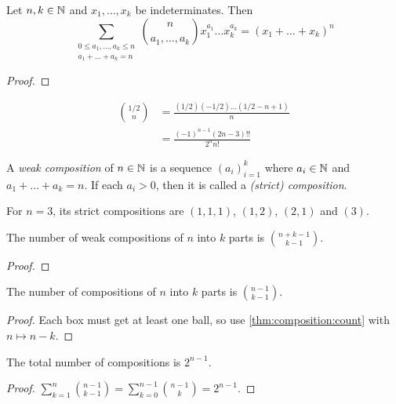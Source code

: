 
\begin{theorem} \label{thm:multinomial}
    Let $n, k \in \mathbb{N}$ and $x_1, \dots, x_k$ be indeterminates.
    Then \[
        \sum_{\substack{0\le a_1, \dots, a_k \le n \\ a_1 + \dots + a_k = n}}
        \binom{n}{a_1, \dots, a_k} x_1^{a_1} \dots x_k^{a_k} = (x_1 + \dots + x_k)^n
    \]
\end{theorem}
\begin{proof}
\end{proof}

\begin{example}
    \begin{align*}
        \binom{1/2}{n}
            &= \frac{(1/2)(-1/2) \dots (1/2 - n + 1)}{n} \\
            &= \frac{(-1)^{n - 1} (2n - 3)!!}{2^n n!}
    \end{align*}
\end{example}

\begin{definition} \label{def:composition}
    A \emph{weak composition} of $n \in \mathbb{N}$ is a sequence $(a_i)_{i=1}^k$
    where $a_i \in \mathbb{N}$ and $a_1 + \dots + a_k = n$.
    If each $a_i > 0$, then it is called a \emph{(strict) composition}.
\end{definition}
\begin{example}
    For $n = 3$, its strict compositions are $(1, 1, 1)$, $(1, 2)$, $(2, 1)$
    and $(3)$.
\end{example}

\begin{proposition} \label{thm:composition:count}
    The number of weak compositions of $n$ into $k$ parts is
    $\binom{n+k-1}{k-1}$.
\end{proposition}
\begin{proof}
\end{proof}
\begin{corollary}
    The number of compositions of $n$ into $k$ parts is $\binom{n-1}{k-1}$.
\end{corollary}
\begin{proof}
    Each box must get at least one ball, so use \cref{thm:composition:count}
    with $n \mapsto n - k$.
\end{proof}
\begin{corollary}
    The total number of compositions is $2^{n-1}$.
\end{corollary}
\begin{proof}
    $\sum_{k=1}^{n} \binom{n-1}{k-1} = \sum_{k=0}^{n-1} \binom{n-1}{k}
    = 2^{n-1}$.
\end{proof}

